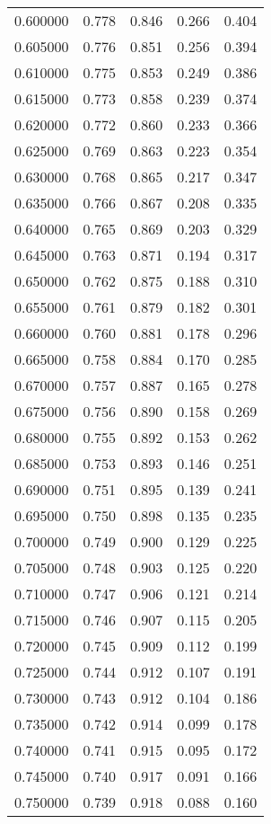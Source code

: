 \begin{table}[htbp]
\begin{tabular}{lllll}
0.600000 & 0.778 & 0.846 & 0.266 & 0.404 \\
0.605000 & 0.776 & 0.851 & 0.256 & 0.394 \\
0.610000 & 0.775 & 0.853 & 0.249 & 0.386 \\
0.615000 & 0.773 & 0.858 & 0.239 & 0.374 \\
0.620000 & 0.772 & 0.860 & 0.233 & 0.366 \\
0.625000 & 0.769 & 0.863 & 0.223 & 0.354 \\
0.630000 & 0.768 & 0.865 & 0.217 & 0.347 \\
0.635000 & 0.766 & 0.867 & 0.208 & 0.335 \\
0.640000 & 0.765 & 0.869 & 0.203 & 0.329 \\
0.645000 & 0.763 & 0.871 & 0.194 & 0.317 \\
0.650000 & 0.762 & 0.875 & 0.188 & 0.310 \\
0.655000 & 0.761 & 0.879 & 0.182 & 0.301 \\
0.660000 & 0.760 & 0.881 & 0.178 & 0.296 \\
0.665000 & 0.758 & 0.884 & 0.170 & 0.285 \\
0.670000 & 0.757 & 0.887 & 0.165 & 0.278 \\
0.675000 & 0.756 & 0.890 & 0.158 & 0.269 \\
0.680000 & 0.755 & 0.892 & 0.153 & 0.262 \\
0.685000 & 0.753 & 0.893 & 0.146 & 0.251 \\
0.690000 & 0.751 & 0.895 & 0.139 & 0.241 \\
0.695000 & 0.750 & 0.898 & 0.135 & 0.235 \\
0.700000 & 0.749 & 0.900 & 0.129 & 0.225 \\
0.705000 & 0.748 & 0.903 & 0.125 & 0.220 \\
0.710000 & 0.747 & 0.906 & 0.121 & 0.214 \\
0.715000 & 0.746 & 0.907 & 0.115 & 0.205 \\
0.720000 & 0.745 & 0.909 & 0.112 & 0.199 \\
0.725000 & 0.744 & 0.912 & 0.107 & 0.191 \\
0.730000 & 0.743 & 0.912 & 0.104 & 0.186 \\
0.735000 & 0.742 & 0.914 & 0.099 & 0.178 \\
0.740000 & 0.741 & 0.915 & 0.095 & 0.172 \\
0.745000 & 0.740 & 0.917 & 0.091 & 0.166 \\
0.750000 & 0.739 & 0.918 & 0.088 & 0.160 \\

\end{tabular}
\end{table}
